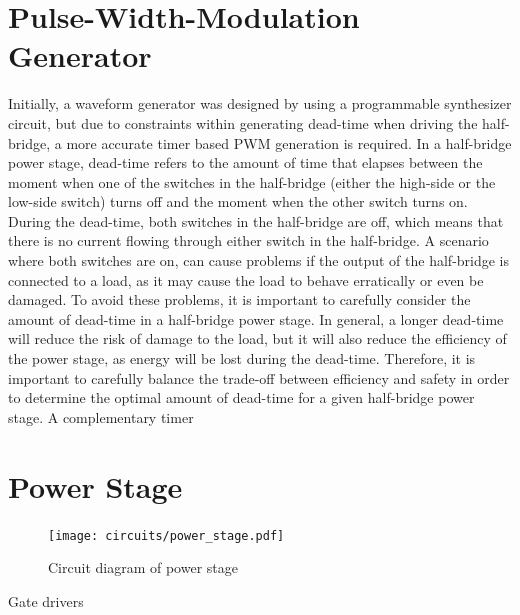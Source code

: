 \section{Pulse-Width-Modulation Generator}
Initially, a waveform generator was designed by using a programmable synthesizer circuit, but due to constraints within generating dead-time when driving the half-bridge, a more accurate timer based PWM generation is required. In a half-bridge power stage, dead-time refers to the amount of time that elapses between the moment when one of the switches in the half-bridge (either the high-side or the low-side switch) turns off and the moment when the other switch turns on. During the dead-time, both switches in the half-bridge are off, which means that there is no current flowing through either switch in the half-bridge. A scenario where both switches are on, can cause problems if the output of the half-bridge is connected to a load, as it may cause the load to behave erratically or even be damaged. To avoid these problems, it is important to carefully consider the amount of dead-time in a half-bridge power stage. In general, a longer dead-time will reduce the risk of damage to the load, but it will also reduce the efficiency of the power stage, as energy will be lost during the dead-time. Therefore, it is important to carefully balance the trade-off between efficiency and safety in order to determine the optimal amount of dead-time for a given half-bridge power stage.
A complementary timer

\section{Power Stage}
\begin{figure}[htbp]
	\centering
	\texttt{[image: circuits/power\_stage.pdf]}
	\label{fig:3_power_stage}
	\caption{Circuit diagram of power stage}
\end{figure}
Gate drivers \cite{ISL55111,MD1213,EL7104}

